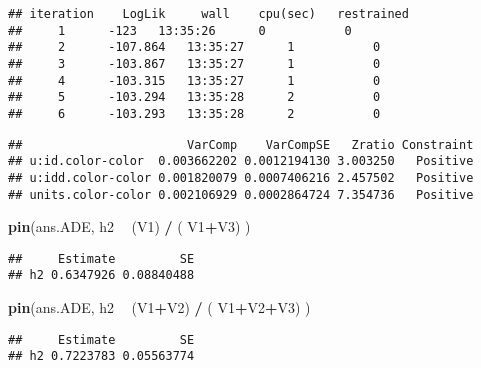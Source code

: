 \documentclass[]{article}
\newenvironment{Shaded}{\begin{snugshade}}{\end{snugshade}}
\newcommand{\KeywordTok}[1]{\textcolor[rgb]{0.13,0.29,0.53}{\textbf{#1}}}
\newcommand{\StringTok}[1]{\textcolor[rgb]{0.31,0.60,0.02}{#1}}
\newcommand{\OperatorTok}[1]{\textcolor[rgb]{0.81,0.36,0.00}{\textbf{#1}}}
\newcommand{\NormalTok}[1]{#1}
\begin{document}
\begin{verbatim}
## iteration    LogLik     wall    cpu(sec)   restrained
##     1      -123   13:35:26      0           0
##     2      -107.864   13:35:27      1           0
##     3      -103.867   13:35:27      1           0
##     4      -103.315   13:35:27      1           0
##     5      -103.294   13:35:28      2           0
##     6      -103.293   13:35:28      2           0
\end{verbatim}

\begin{Shaded}
\end{Shaded}

\begin{verbatim}
##                       VarComp    VarCompSE   Zratio Constraint
## u:id.color-color  0.003662202 0.0012194130 3.003250   Positive
## u:idd.color-color 0.001820079 0.0007406216 2.457502   Positive
## units.color-color 0.002106929 0.0002864724 7.354736   Positive
\end{verbatim}

\begin{Shaded}
\begin{Highlighting}[]
\KeywordTok{pin}\NormalTok{(ans.ADE, h2 }\OperatorTok{~}\StringTok{ }\NormalTok{(V1) }\OperatorTok{/}\StringTok{ }\NormalTok{( V1}\OperatorTok{+}\NormalTok{V3) )}
\end{Highlighting}
\end{Shaded}

\begin{verbatim}
##     Estimate         SE
## h2 0.6347926 0.08840488
\end{verbatim}

\begin{Shaded}
\begin{Highlighting}[]
\KeywordTok{pin}\NormalTok{(ans.ADE, h2 }\OperatorTok{~}\StringTok{ }\NormalTok{(V1}\OperatorTok{+}\NormalTok{V2) }\OperatorTok{/}\StringTok{ }\NormalTok{( V1}\OperatorTok{+}\NormalTok{V2}\OperatorTok{+}\NormalTok{V3) )}
\end{Highlighting}
\end{Shaded}

\begin{verbatim}
##     Estimate         SE
## h2 0.7223783 0.05563774
\end{verbatim}
\end{document}
